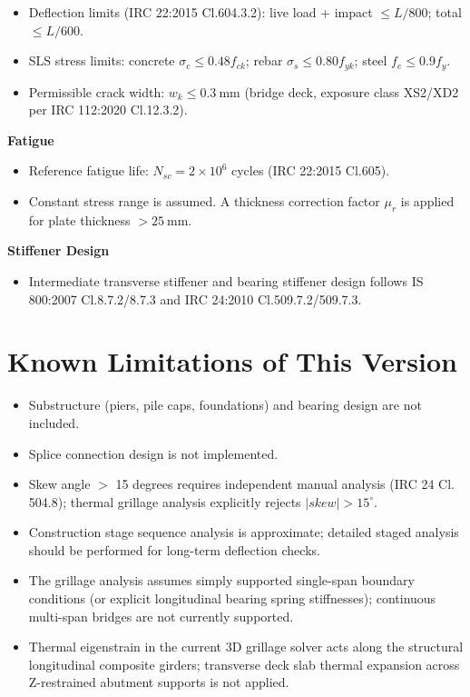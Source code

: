 \documentclass[12pt,a4paper]{report}
\numberwithin{table}{chapter}
\numberwithin{figure}{chapter}
\begin{document}
\begin{itemize}
\item Deflection limits (IRC 22:2015 Cl.604.3.2): live load + impact $\leq L/800$; total $\leq L/600$.
\item SLS stress limits: concrete $\sigma_c \leq 0.48 f_{ck}$; rebar $\sigma_s \leq 0.80 f_{yk}$; steel $f_e \leq 0.9 f_y$.
\item Permissible crack width: $w_k \leq 0.3 \ \text{mm}$ (bridge deck, exposure class XS2/XD2 per IRC 112:2020 Cl.12.3.2).
\end{itemize}

\textbf{Fatigue}

\begin{itemize}
\item Reference fatigue life: $N_{sc} = 2 \times 10^6$ cycles (IRC 22:2015 Cl.605).
\item Constant stress range is assumed. A thickness correction factor $\mu_r$ is applied for plate thickness $> 25 \ \text{mm}$.
\end{itemize}

\textbf{Stiffener Design}

\begin{itemize}
\item Intermediate transverse stiffener and bearing stiffener design follows IS 800:2007 Cl.8.7.2/8.7.3 and IRC 24:2010 Cl.509.7.2/509.7.3.
\end{itemize}


\section{Known Limitations of This Version}
\label{sec:limitations}

\begin{itemize}
\item Substructure (piers, pile caps, foundations) and bearing design are not included.
\item Splice connection design is not implemented.
\item Skew angle $>$ 15 degrees requires independent manual analysis (IRC 24 Cl. 504.8); thermal grillage analysis explicitly rejects $|skew| > 15^\circ$.
\item Construction stage sequence analysis is approximate; detailed staged analysis
  should be performed for long-term deflection checks.
\item The grillage analysis assumes simply supported single-span boundary conditions (or explicit longitudinal bearing spring stiffnesses); continuous multi-span bridges are not currently supported.
\item Thermal eigenstrain in the current 3D grillage solver acts along the structural longitudinal composite girders; transverse deck slab thermal expansion across Z-restrained abutment supports is not applied.
\end{itemize}
\end{document}
